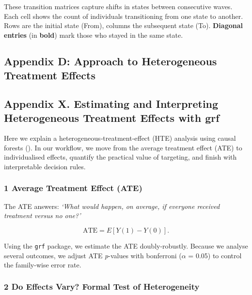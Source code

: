 \documentclass[
  single column]{article}
\begin{document}
These transition matrices capture shifts in states between consecutive
waves. Each cell shows the count of individuals transitioning from one
state to another. Rows are the initial state (From), columns the
subsequent state (To). \textbf{Diagonal entries} (in \textbf{bold}) mark
those who stayed in the same state.

\newpage{}

\subsection{Appendix D: Approach to Heterogeneous Treatment
Effects}\label{appendix-cate-validation}

\subsection{\texorpdfstring{Appendix X. Estimating and Interpreting
Heterogeneous Treatment Effects with
\textbf{grf}}{Appendix X. Estimating and Interpreting Heterogeneous Treatment Effects with grf}}\label{appendix-x.-estimating-and-interpreting-heterogeneous-treatment-effects-with-grf}

Here we explain a heterogeneous‐treatment‐effect (HTE) analysis using
causal forests (). In our
workflow, we move from the average treatment effect (ATE) to
individualised effects, quantify the practical value of targeting, and
finish with interpretable decision rules.

\subsubsection{1 Average Treatment Effect
(ATE)}\label{average-treatment-effect-ate}

The ATE answers: \emph{`What would happen, on average, if everyone
received treatment versus no one?'}

\[
    \text{ATE}=E[Y(1)-Y(0)].
\]

Using the \texttt{grf} package, we estimate the ATE doubly-robustly.
Because we analyse several outcomes, we adjust ATE \emph{p}-values with
bonferroni (\(\alpha\) = 0.05) to control the family-wise error rate.

\subsubsection{2 Do Effects Vary? Formal Test of
Heterogeneity}\label{do-effects-vary-formal-test-of-heterogeneity}
\end{document}
